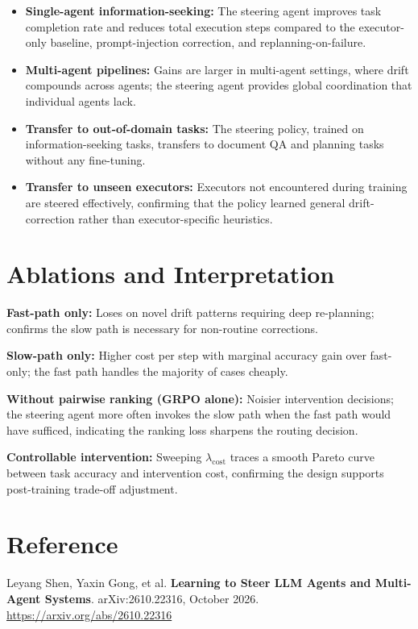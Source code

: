 \documentclass[10pt,twocolumn]{article}
\begin{document}
\begin{itemize}[itemsep=2pt,parsep=0pt]
  \item \textbf{Single-agent information-seeking:} The steering agent
    improves task completion rate and reduces total execution steps
    compared to the executor-only baseline, prompt-injection correction,
    and replanning-on-failure.
  \item \textbf{Multi-agent pipelines:} Gains are larger in multi-agent
    settings, where drift compounds across agents; the steering agent
    provides global coordination that individual agents lack.
  \item \textbf{Transfer to out-of-domain tasks:} The steering policy,
    trained on information-seeking tasks, transfers to document QA and
    planning tasks without any fine-tuning.
  \item \textbf{Transfer to unseen executors:} Executors not encountered
    during training are steered effectively, confirming that the policy
    learned general drift-correction rather than executor-specific heuristics.
\end{itemize}

\section{Ablations and Interpretation}

\textbf{Fast-path only:} Loses on novel drift patterns requiring deep
re-planning; confirms the slow path is necessary for non-routine corrections.

\textbf{Slow-path only:} Higher cost per step with marginal accuracy gain
over fast-only; the fast path handles the majority of cases cheaply.

\textbf{Without pairwise ranking (GRPO alone):} Noisier intervention
decisions; the steering agent more often invokes the slow path when the fast
path would have sufficed, indicating the ranking loss sharpens the routing
decision.

\textbf{Controllable intervention:} Sweeping $\lambda_{\text{cost}}$ traces
a smooth Pareto curve between task accuracy and intervention cost, confirming
the design supports post-training trade-off adjustment.

\section*{Reference}

Leyang Shen, Yaxin Gong, et al.
\textbf{Learning to Steer LLM Agents and Multi-Agent Systems}.
arXiv:2610.22316, October 2026.
\url{https://arxiv.org/abs/2610.22316}
\end{document}
